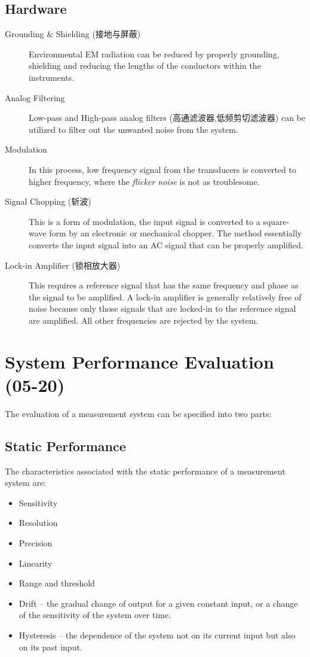 \documentclass[a4paper,UTF8]{article}
\theoremstyle{mystyle}{
  \newtheorem{law}{Law}
}
\begin{document}
\subsection{Hardware}
\begin{description}%
\item[Grounding \& Shielding (接地与屏蔽)]

Environmental EM radiation can be reduced by properly
grounding, shielding and reducing the lengths of the conductors
within the instruments.
\item[Analog Filtering]

Low-pass and High-pass analog filters (高通滤波器,低频剪切滤波器) can be utilized to filter
out the unwanted noise from the system.
\item[Modulation]
In this process, low frequency signal from the transducers is
converted to higher frequency, where the \emph{flicker noise} is not as
troublesome.

\item[Signal Chopping (斩波)]

This is a form of modulation, the input signal is converted to a
square-wave form by an electronic or mechanical chopper. The
method essentially converts the input signal into an AC signal
that can be properly amplified.

\item[Lock-in Amplifier (锁相放大器)]

This requires a reference signal that has the same frequency
and phase as the signal to be amplified. A lock-in amplifier is
generally relatively free of noise because only those signals that
are locked-in to the reference signal are amplified. All other
frequencies are rejected by the system.
\end{description}


\section{System Performance Evaluation (05-20)}
The evaluation of a measurement system can be
specified into two parts:
\subsection{Static Performance}
The characteristics associated with the static performance of
a measurement system are:
\begin{itemize}
\item Sensitivity
\item Resolution
\item Precision
\item Linearity
\item Range and threshold
\item Drift – the gradual change of output for a given constant input,
or a change of the sensitivity of the system over time.
\item Hysteresis – the dependence of the system not on its current
input but also on its past input.
\end{itemize}
\end{document}
